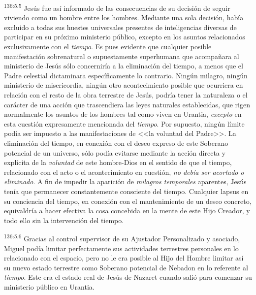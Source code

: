 \par 
\textsuperscript{136:5.5} Jesús fue así informado de las consecuencias de su decisión de seguir viviendo como un hombre entre los hombres. Mediante una sola decisión, había excluido a todas sus huestes universales presentes de inteligencias diversas de participar en su próximo ministerio público, excepto en los asuntos relacionados exclusivamente con el \textit{tiempo}. Es pues evidente que cualquier posible manifestación sobrenatural o supuestamente superhumana que acompañara al ministerio de Jesús sólo concerniría a la eliminación del tiempo, a menos que el Padre celestial dictaminara específicamente lo contrario. Ningún milagro, ningún ministerio de misericordia, ningún otro acontecimiento posible que ocurriera en relación con el resto de la obra terrestre de Jesús, podría tener la naturaleza o el carácter de una acción que trascendiera las leyes naturales establecidas, que rigen normalmente los asuntos de los hombres tal como viven en Urantia, \textit{excepto} en esta cuestión expresamente mencionada del \textit{tiempo}. Por supuesto, ningún límite podía ser impuesto a las manifestaciones de <<la voluntad del Padre>>. La eliminación del tiempo, en conexión con el deseo expreso de este Soberano potencial de un universo, sólo podía evitarse mediante la acción directa y explícita de la \textit{voluntad} de este hombre-Dios en el sentido de que el tiempo, relacionado con el acto o el acontecimiento en cuestión, \textit{no debía ser acortado o eliminado}. A fin de impedir la aparición de \textit{milagros temporales} aparentes, Jesús tenía que permanecer constantemente consciente del tiempo. Cualquier lapsus en su conciencia del tiempo, en conexión con el mantenimiento de un deseo concreto, equivaldría a hacer efectiva la cosa concebida en la mente de este Hijo Creador, y todo ello sin la intervención del tiempo.

\par 
\textsuperscript{136:5.6} Gracias al control supervisor de su Ajustador Personalizado y asociado, Miguel podía limitar perfectamente sus actividades terrestres personales en lo relacionado con el espacio, pero no le era posible al Hijo del Hombre limitar así su nuevo estado terrestre como Soberano potencial de Nebadon en lo referente al \textit{tiempo}. Este era el estado real de Jesús de Nazaret cuando salió para comenzar su ministerio público en Urantia.


